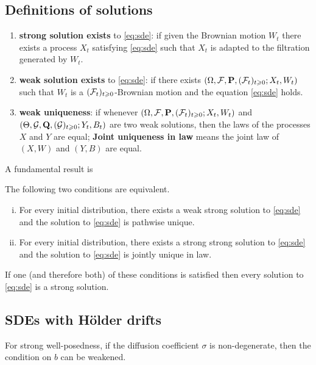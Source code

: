 	\subsection{Definitions of solutions}
	\begin{enumerate}
		\item {\bf strong solution exists} to \eqref{eq:sde}: if given the Brownian motion $W_t$ there exists a process $X_t$ satisfying \eqref{eq:sde} such that $X_t$ is adapted to the filtration generated by $W_t$.
		\item {\bf weak solution exists} to \eqref{eq:sde}: if there exists $(\Omega, {\mathcal F}, {\mathbf P}, ({\mathcal F}_t)_{t\geqslant 0}; X_t, W_t)$ such that $W_t$ is a $({\mathcal F}_t)_{t\geqslant 0}$-Brownian motion and the equation \eqref{eq:sde} holds. 
		\item {\bf weak uniqueness}: if whenever $(\Omega, {\mathcal F}, {\mathbf P}, ({\mathcal F}_t)_{t\geqslant 0}; X_t, W_t)$ and \\ $(\Theta, {\mathcal G}, {\mathbf Q}, ({\mathcal G})_{t\geqslant 0}; Y_t, B_t)$ are two weak solutions, then the laws of the processes $X$ and $Y$ are equal; {\bf Joint uniqueness in law} means the joint law of $(X,W)$ and $(Y,B)$ are equal. 
	\end{enumerate}
A fundamental result is 
\begin{theorem}\label{thm:YWE}
    The following two conditions are equivalent.
    \begin{enumerate}[(i)]
        \item For every initial distribution, there exists a weak strong solution to \eqref{eq:sde} and the solution to \eqref{eq:sde} is pathwise unique. 
        \item For every initial distribution, there exists a strong strong solution to \eqref{eq:sde} and the solution to \eqref{eq:sde} is jointly unique in law.
    \end{enumerate}
    If one (and therefore both) of these conditions is satisfied then every solution to \eqref{eq:sde} is a strong solution. 
\end{theorem}

\begin{proposition}
        
\end{proposition}

\subsection{SDEs with H\"older drifts}
For strong well-posedness, if the diffusion coefficient $\sigma$ is non-degenerate, then the condition on $b$ can be weakened. 

